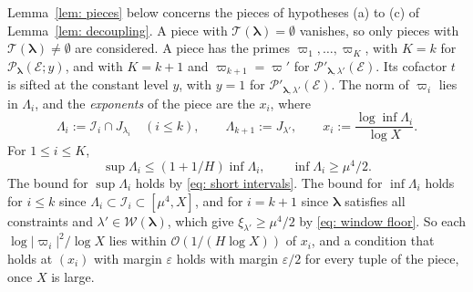 \documentclass{article}
\numberwithin{equation}{section}
\newcommand{\Le}{\leqslant}
\newcommand{\Ge}{\geqslant}
\begin{document}
Lemma~\ref{lem: pieces} below concerns the pieces of hypotheses (a) to (c) of Lemma~\ref{lem: decoupling}. A piece with $\mathcal{T}(\boldsymbol{\lambda}) = \emptyset$ vanishes, so only pieces with $\mathcal{T}(\boldsymbol{\lambda}) \neq \emptyset$ are considered. A piece has the primes $\varpi_1, \dots, \varpi_K$, with $K = k$ for $\mathcal{P}_{\boldsymbol{\lambda}}(\mathcal{E}; y)$, and with $K = k + 1$ and $\varpi_{k+1} = \varpi'$ for $\mathcal{P}'_{\boldsymbol{\lambda},\lambda'}(\mathcal{E})$. Its cofactor $t$ is sifted at the constant level $y$, with $y = 1$ for $\mathcal{P}'_{\boldsymbol{\lambda},\lambda'}(\mathcal{E})$. The norm of $\varpi_i$ lies in $\Lambda_i$, and the \emph{exponents} of the piece are the $x_i$, where
\begin{equation}
\label{eq: piece exponents}
\Lambda_i := \mathcal{I}_i \cap J_{\lambda_i} \quad (i \Le k), \qquad \Lambda_{k+1} := J_{\lambda'}, \qquad x_i := \frac{\log \inf \Lambda_i}{\log X}.
\end{equation}
For $1 \Le i \Le K$,
\begin{equation}
\label{eq: piece intervals}
\sup \Lambda_i \Le (1 + 1/H) \inf \Lambda_i, \qquad \inf \Lambda_i \Ge \mu^4/2.
\end{equation}
The bound for $\sup \Lambda_i$ holds by \eqref{eq: short intervals}. The bound for $\inf \Lambda_i$ holds for $i \Le k$ since $\Lambda_i \subset \mathcal{I}_i \subset [\mu^4, X]$, and for $i = k + 1$ since $\boldsymbol{\lambda}$ satisfies all constraints and $\lambda' \in \mathcal{W}(\boldsymbol{\lambda})$, which give $\xi_{\lambda'} \Ge \mu^4/2$ by \eqref{eq: window floor}. So each $\log|\varpi_i|^2/\log X$ lies within $\mathcal{O}(1/(H \log X))$ of $x_i$, and a condition that holds at $(x_i)$ with margin $\varepsilon$ holds with margin $\varepsilon/2$ for every tuple of the piece, once $X$ is large.
\end{document}
